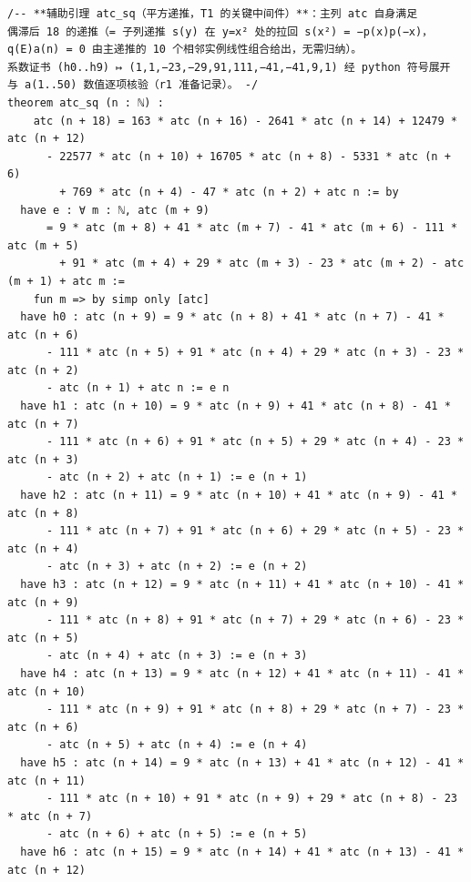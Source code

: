 \documentclass[11pt]{article}
\theoremstyle{definition}
\begin{document}
\begin{lstlisting}[caption={The auxiliary lemma \lean{atc_sq} in full, verbatim
excerpt of the final artifact \texttt{final/01-comb09-4ntwocorner-proved.lean}
(lines 106--150, sha256 \texttt{f1aa7099}; line endings normalized from CRLF, no
other byte changed). The lemma is the only declaration the final file adds to
the frozen statements; it lives in the proof layer and is allowed as such by the
audit.},label={lst:atcsq}]
/-- **辅助引理 atc_sq（平方递推，T1 的关键中间件）**：主列 atc 自身满足
偶滞后 18 的递推（= 子列递推 s(y) 在 y=x² 处的拉回 s(x²) = −p(x)p(−x)，
q(E)a(n) = 0 由主递推的 10 个相邻实例线性组合给出，无需归纳）。
系数证书 (h0..h9) ↦ (1,1,−23,−29,91,111,−41,−41,9,1) 经 python 符号展开
与 a(1..50) 数值逐项核验（r1 准备记录）。 -/
theorem atc_sq (n : ℕ) :
    atc (n + 18) = 163 * atc (n + 16) - 2641 * atc (n + 14) + 12479 * atc (n + 12)
      - 22577 * atc (n + 10) + 16705 * atc (n + 8) - 5331 * atc (n + 6)
        + 769 * atc (n + 4) - 47 * atc (n + 2) + atc n := by
  have e : ∀ m : ℕ, atc (m + 9)
      = 9 * atc (m + 8) + 41 * atc (m + 7) - 41 * atc (m + 6) - 111 * atc (m + 5)
        + 91 * atc (m + 4) + 29 * atc (m + 3) - 23 * atc (m + 2) - atc (m + 1) + atc m :=
    fun m => by simp only [atc]
  have h0 : atc (n + 9) = 9 * atc (n + 8) + 41 * atc (n + 7) - 41 * atc (n + 6)
      - 111 * atc (n + 5) + 91 * atc (n + 4) + 29 * atc (n + 3) - 23 * atc (n + 2)
      - atc (n + 1) + atc n := e n
  have h1 : atc (n + 10) = 9 * atc (n + 9) + 41 * atc (n + 8) - 41 * atc (n + 7)
      - 111 * atc (n + 6) + 91 * atc (n + 5) + 29 * atc (n + 4) - 23 * atc (n + 3)
      - atc (n + 2) + atc (n + 1) := e (n + 1)
  have h2 : atc (n + 11) = 9 * atc (n + 10) + 41 * atc (n + 9) - 41 * atc (n + 8)
      - 111 * atc (n + 7) + 91 * atc (n + 6) + 29 * atc (n + 5) - 23 * atc (n + 4)
      - atc (n + 3) + atc (n + 2) := e (n + 2)
  have h3 : atc (n + 12) = 9 * atc (n + 11) + 41 * atc (n + 10) - 41 * atc (n + 9)
      - 111 * atc (n + 8) + 91 * atc (n + 7) + 29 * atc (n + 6) - 23 * atc (n + 5)
      - atc (n + 4) + atc (n + 3) := e (n + 3)
  have h4 : atc (n + 13) = 9 * atc (n + 12) + 41 * atc (n + 11) - 41 * atc (n + 10)
      - 111 * atc (n + 9) + 91 * atc (n + 8) + 29 * atc (n + 7) - 23 * atc (n + 6)
      - atc (n + 5) + atc (n + 4) := e (n + 4)
  have h5 : atc (n + 14) = 9 * atc (n + 13) + 41 * atc (n + 12) - 41 * atc (n + 11)
      - 111 * atc (n + 10) + 91 * atc (n + 9) + 29 * atc (n + 8) - 23 * atc (n + 7)
      - atc (n + 6) + atc (n + 5) := e (n + 5)
  have h6 : atc (n + 15) = 9 * atc (n + 14) + 41 * atc (n + 13) - 41 * atc (n + 12)

\end{lstlisting}
\end{document}
